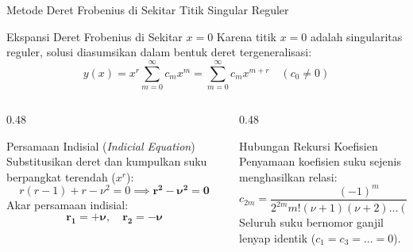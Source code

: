\documentclass[aspectratio=169,10pt]{beamer}
\begin{document}
\begin{frame}{Metode Deret Frobenius di Sekitar Titik Singular Reguler}
  \begin{block}{Ekspansi Deret Frobenius di Sekitar $x = 0$}
    \small
    Karena titik $x = 0$ adalah singularitas reguler, solusi diasumsikan dalam bentuk deret tergeneralisasi:
    \begin{equation*}
      y(x) = x^r \sum_{m=0}^{\infty} c_m x^m = \sum_{m=0}^{\infty} c_m x^{m+r} \quad (c_0 \ne 0)
    \end{equation*}
  \end{block}
  \begin{columns}[t]
    \begin{column}{0.48\textwidth}
      \begin{alertblock}{Persamaan Indisial (\textit{Indicial Equation})}
        \small
        Substitusikan deret dan kumpulkan suku berpangkat terendah ($x^r$):
        \begin{equation*}
          r(r - 1) + r - \nu^2 = 0 \implies \mathbf{r^2 - \nu^2 = 0}
        \end{equation*}
        Akar persamaan indisial:
        \begin{equation*}
          \mathbf{r_1 = +\nu, \quad r_2 = -\nu}
        \end{equation*}
      \end{alertblock}
    \end{column}
    \begin{column}{0.48\textwidth}
      \begin{exampleblock}{Hubungan Rekursi Koefisien}
        \small
        Penyamaan koefisien suku sejenis menghasilkan relasi:
        \begin{equation*}
          c_{2m} = \frac{(-1)^m}{2^{2m} m! (\nu + 1)(\nu + 2)\dots(\nu + m)} c_0
        \end{equation*}
        Seluruh suku bernomor ganjil lenyap identik ($c_1 = c_3 = \dots = 0$).
      \end{exampleblock}
    \end{column}
  \end{columns}
\end{frame}
\end{document}
